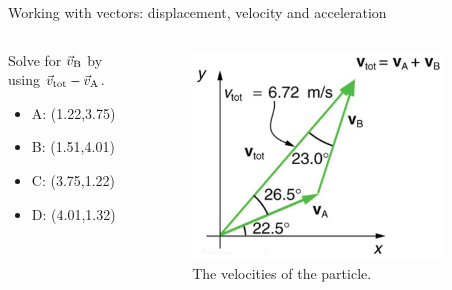 \documentclass{beamer}
\begin{document}
\begin{frame}{Working with vectors: displacement, velocity and acceleration}
\begin{columns}[T]
\begin{column}{0.5\textwidth}
\small Solve for $\vec{v}_{\rm B}$ by using $\vec{v}_{\rm tot} - \vec{v}_{\rm A}$.
\begin{itemize}
\item A: (1.22,3.75)
\item B: (1.51,4.01)
\item C: (3.75,1.22)
\item D: (4.01,1.32)
\end{itemize}
\end{column}
\begin{column}{0.5\textwidth}
\begin{figure}
\centering
\includegraphics[width=0.9\textwidth]{figures/vecdiag2.png}
\caption{\label{fig:vecdiag4} The velocities of the particle.}
\end{figure}
\end{column}
\end{columns}
\end{frame}
\end{document}
